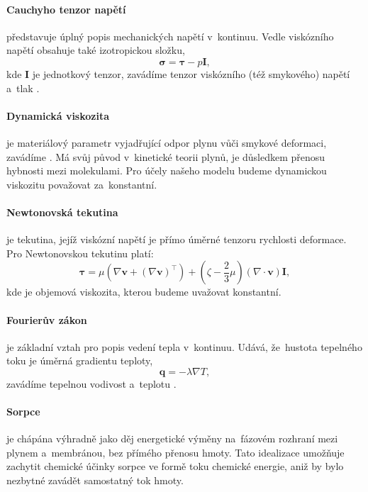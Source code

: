 \paragraph{Cauchyho tenzor napětí} představuje úplný popis mechanických napětí v~kontinuu. Vedle viskózního napětí obsahuje také izotropickou složku,
\begin{equation}\label{eq:cauchy_stress_tensor}
    \bm{\sigma}=\bm{\tau}-p\bm{I},
\end{equation}
kde $\bm{I}$ je jednotkový tenzor, zavádíme tenzor viskózního (též smykového) napětí \Unit{\bm{\tau}}{\pascal} a~tlak .

\paragraph{Dynamická viskozita} je materiálový parametr vyjadřující odpor plynu vůči smykové deformaci, zavádíme \Unit{\mu}{\pascal\second}. Má svůj původ v~kinetické teorii plynů, je důsledkem přenosu hybnosti mezi molekulami. Pro účely našeho modelu budeme dynamickou viskozitu považovat za~konstantní. 

\paragraph{Newtonovská tekutina} je tekutina, jejíž viskózní napětí je přímo úměrné tenzoru rychlosti deformace. Pro Newtonovskou tekutinu platí:
\begin{equation}\label{eq:deviatoric_stress_tensor}
\bm{\tau}=\mu\left(\nabla \bm{v}+\left(\nabla\bm{v}\right)^\top\right)+\left(\zeta-\frac{2}{3}\mu\right)\left(\nabla\cdot\bm{v}\right)\bm{I},
\end{equation}
kde \Unit{\zeta}{\pascal\second} je objemová viskozita, kterou budeme uvažovat konstantní.

\paragraph{Fourierův zákon} je základní vztah pro popis vedení tepla v~kontinuu. Udává, že~hustota tepelného toku je úměrná gradientu teploty,
\begin{equation}
    \bm{q}=-\lambda \nabla T,
\end{equation}
zavádíme tepelnou vodivost \Unit{\lambda}{\watt\per\meter\per\kelvin} a~teplotu . 

\paragraph{Sorpce} je chápána výhradně jako děj energetické výměny na~fázovém rozhraní mezi plynem a~membránou, bez přímého přenosu hmoty. Tato idealizace umožňuje zachytit chemické účinky sorpce ve formě toku chemické energie, aniž by bylo nezbytné zavádět samostatný tok hmoty.

